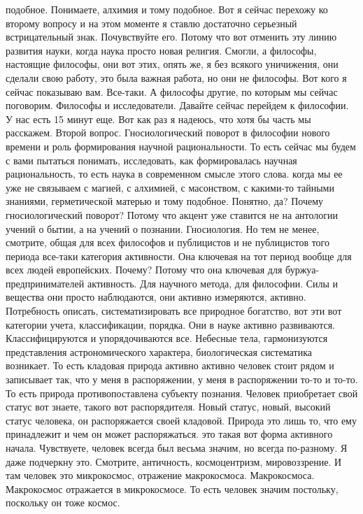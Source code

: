 подобное. Понимаете, алхимия и тому подобное. Вот я сейчас перехожу ко второму
вопросу и на этом моменте я ставлю достаточно серьезный встрицательный знак.
Почувствуйте его. Потому что вот отменить эту линию развития науки, когда наука
просто новая религия. Смогли, а философы, настоящие философы, они вот этих,
опять же, я без всякого уничижения, они сделали свою работу, это была важная
работа, но они не философы. Вот кого я сейчас показываю вам. Все-таки. А
философы другие, по которым мы сейчас поговорим. Философы и исследователи.
Давайте сейчас перейдем к философии. У нас есть 15 минут еще. Вот как раз я
надеюсь, что хотя бы часть мы расскажем. Второй вопрос. Гносиологический поворот
в философии нового времени и роль формирования научной рациональности. То есть
сейчас мы будем с вами пытаться понимать, исследовать, как формировалась научная
рациональность, то есть наука в современном смысле этого слова. когда мы ее уже
не связываем с магией, с алхимией, с масонством, с какими-то тайными знаниями,
герметической матерью и тому подобное. Понятно, да? Почему гносиологический
поворот? Потому что акцент уже ставится не на антологии учений о бытии, а на
учений о познании. Гносиология. Но тем не менее, смотрите, общая для всех
философов и публицистов и не публицистов того периода все-таки категория
активности. Она ключевая на тот период вообще для всех людей европейских.
Почему? Потому что она ключевая для буржуа-предпринимателей активность. Для
научного метода, для философии. Силы и вещества они просто наблюдаются, они
активно измеряются, активно. Потребность описать, систематизировать все
природное богатство, вот эти вот категории учета, классификации, порядка. Они в
науке активно развиваются. Классифицируются и упорядочиваются все. Небесные
тела, гармонизуются представления астрономического характера, биологическая
систематика возникает. То есть кладовая природа активно активно человек стоит
рядом и записывает так, что у меня в распоряжении, у меня в распоряжении то-то и
то-то. То есть природа противопоставлена субъекту познания. Человек приобретает
свой статус вот знаете, такого вот распорядителя. Новый статус, новый, высокий
статус человека, он распоряжается своей кладовой. Природа это лишь то, что ему
принадлежит и чем он может распоряжаться. это такая вот форма активного начала.
Чувствуете, человек всегда был весьма значим, но всегда по-разному. Я даже
подчеркну это. Смотрите, античность, космоцентризм, мировоззрение. И там человек
это микрокосмос, отражение макрокосмоса. Макрокосмоса. Макрокосмос отражается в
микрокосмосе. То есть человек значим постольку, поскольку он тоже космос.
